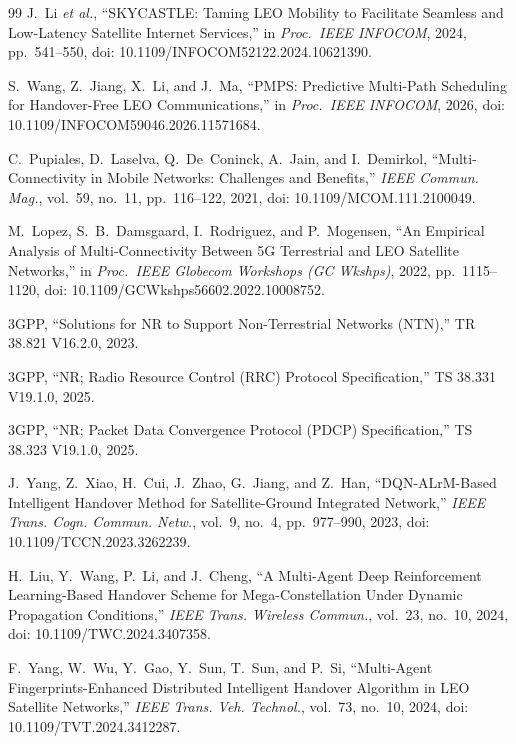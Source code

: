 \documentclass[journal]{IEEEtran}
\begin{document}
\begin{thebibliography}{99}
J.~Li \emph{et al.}, ``SKYCASTLE: Taming LEO Mobility to Facilitate Seamless and Low-Latency Satellite Internet Services,'' in \emph{Proc.\ IEEE INFOCOM}, 2024, pp.~541--550, doi: 10.1109/INFOCOM52122.2024.10621390.

S.~Wang, Z.~Jiang, X.~Li, and J.~Ma, ``PMPS: Predictive Multi-Path Scheduling for Handover-Free LEO Communications,'' in \emph{Proc.\ IEEE INFOCOM}, 2026, doi: 10.1109/INFOCOM59046.2026.11571684.

C.~Pupiales, D.~Laselva, Q.~De~Coninck, A.~Jain, and I.~Demirkol, ``Multi-Connectivity in Mobile Networks: Challenges and Benefits,'' \emph{IEEE Commun. Mag.}, vol.~59, no.~11, pp.~116--122, 2021, doi: 10.1109/MCOM.111.2100049.

M.~Lopez, S.~B.~Damsgaard, I.~Rodriguez, and P.~Mogensen, ``An Empirical Analysis of Multi-Connectivity Between 5G Terrestrial and LEO Satellite Networks,'' in \emph{Proc.\ IEEE Globecom Workshops (GC Wkshps)}, 2022, pp.~1115--1120, doi: 10.1109/GCWkshps56602.2022.10008752.

3GPP, ``Solutions for NR to Support Non-Terrestrial Networks (NTN),'' TR 38.821 V16.2.0, 2023.

3GPP, ``NR; Radio Resource Control (RRC) Protocol Specification,'' TS 38.331 V19.1.0, 2025.

3GPP, ``NR; Packet Data Convergence Protocol (PDCP) Specification,'' TS 38.323 V19.1.0, 2025.

J.~Yang, Z.~Xiao, H.~Cui, J.~Zhao, G.~Jiang, and Z.~Han, ``DQN-ALrM-Based Intelligent Handover Method for Satellite-Ground Integrated Network,'' \emph{IEEE Trans. Cogn. Commun. Netw.}, vol.~9, no.~4, pp.~977--990, 2023, doi: 10.1109/TCCN.2023.3262239.

H.~Liu, Y.~Wang, P.~Li, and J.~Cheng, ``A Multi-Agent Deep Reinforcement Learning-Based Handover Scheme for Mega-Constellation Under Dynamic Propagation Conditions,'' \emph{IEEE Trans. Wireless Commun.}, vol.~23, no.~10, 2024, doi: 10.1109/TWC.2024.3407358.

F.~Yang, W.~Wu, Y.~Gao, Y.~Sun, T.~Sun, and P.~Si, ``Multi-Agent Fingerprints-Enhanced Distributed Intelligent Handover Algorithm in LEO Satellite Networks,'' \emph{IEEE Trans. Veh. Technol.}, vol.~73, no.~10, 2024, doi: 10.1109/TVT.2024.3412287.


\end{thebibliography}
\end{document}
